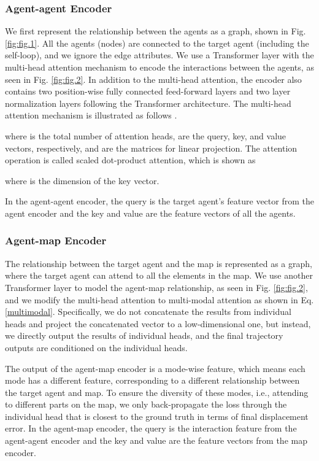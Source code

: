 \documentclass[letterpaper, 10 pt, conference]{ieeeconf}
\begin{document}
\subsubsection{Agent-agent Encoder}
We first represent the relationship between the agents as a graph, shown in Fig. \ref{fig:fig.1}. All the agents (nodes) are connected to the target agent (including the self-loop), and we ignore the edge attributes. We use a Transformer layer with the multi-head attention mechanism to encode the interactions between the agents, as seen in Fig. \ref{fig:fig.2}. In addition to the multi-head attention, the encoder also contains two position-wise fully connected feed-forward layers and two layer normalization layers following the Transformer architecture. The multi-head attention mechanism is illustrated as follows \cite{vaswani2017attention}.


where  is the total number of attention heads,  are the query, key, and value vectors, respectively, and  are the matrices for linear projection. The attention operation is called scaled dot-product attention, which is shown as

where  is the dimension of the key vector.

In the agent-agent encoder, the query is the target agent's feature vector from the agent encoder and the key and value are the feature vectors of all the agents. 

\subsubsection{Agent-map Encoder} 
The relationship between the target agent and the map is represented as a graph, where the target agent can attend to all the elements in the map. We use another Transformer layer to model the agent-map relationship, as seen in Fig. \ref{fig:fig.2}, and we modify the multi-head attention to multi-modal attention as shown in Eq. \ref{multimodal}. Specifically, we do not concatenate the results from individual heads and project the concatenated vector to a low-dimensional one, but instead, we directly output the results of individual heads, and the final trajectory outputs are conditioned on the individual heads.


The output of the agent-map encoder is a mode-wise feature, which means each mode has a different feature, corresponding to a different relationship between the target agent and map. To ensure the diversity of these modes, i.e., attending to different parts on the map, we only back-propagate the loss through the individual head that is closest to the ground truth in terms of final displacement error. In the agent-map encoder, the query is the interaction feature from the agent-agent encoder and the key and value are the feature vectors from the map encoder. 
\end{document}
